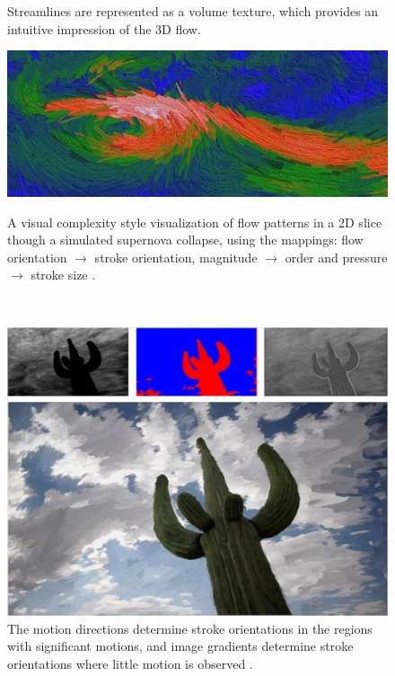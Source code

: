 \begin{figure}
\begin{minipage}{.49\textwidth}
		\caption{Streamlines are represented as a volume texture, which provides an intuitive impression of the 3D flow. \cite{liu_texture-based_2005}}
		\label{fig:liu_texture-based_2005}
	\end{minipage}
\end{figure}

\begin{figure}
	\centering
	\begin{minipage}{.49\textwidth}
		\centering
		\includegraphics[width=1\linewidth]{images/tateosian_engaging_2007.png}
		\caption{A visual complexity style visualization of flow patterns in a 2D slice though a simulated supernova collapse, using the mappings: flow orientation $ \rightarrow $ stroke orientation, magnitude $ \rightarrow $ order and pressure $ \rightarrow $ stroke size \cite{tateosian_engaging_2007}.}
		\label{fig:tateosian_engaging_2007}
	\end{minipage}~
	\begin{minipage}{.49\textwidth}
		\centering
		\includegraphics[width=1\linewidth]{images/lee_motion_2009.png}
		\caption{The motion directions determine stroke orientations in the regions with significant motions, and image gradients determine stroke orientations where little motion is observed \cite{lee_motion_2009}.}
		\label{fig:lee_motion_2009}
	\end{minipage}
\end{figure}



